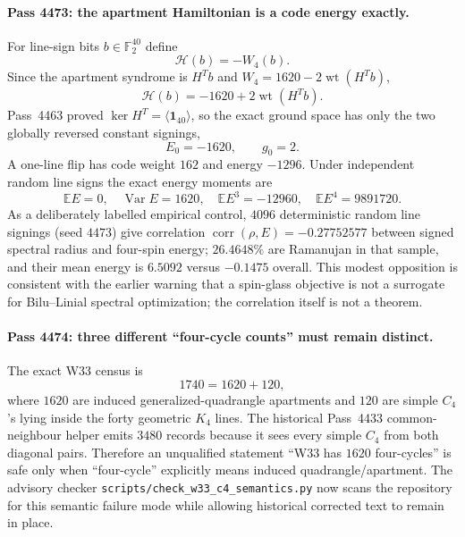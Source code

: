 \paragraph{Pass 4473: the apartment Hamiltonian is a code energy exactly.}
For line-sign bits $b\in\mathbb F_2^{40}$ define
\[
  \mathcal H(b)=-W_4(b).
\]
Since the apartment syndrome is $H^Tb$ and
$W_4=1620-2\operatorname{wt}(H^Tb)$,
\begin{equation}
  \boxed{\mathcal H(b)=-1620+2\operatorname{wt}(H^Tb).}
  \label{eq:pass4473-hamiltonian}
\end{equation}
Pass~4463 proved $\ker H^T=\langle\mathbf1_{40}\rangle$, so the exact ground
space has only the two globally reversed constant signings,
\begin{equation}
  \boxed{E_0=-1620,\qquad g_0=2.}
  \label{eq:pass4473-ground}
\end{equation}
A one-line flip has code weight $162$ and energy $-1296$.  Under independent
random line signs the exact energy moments are
\[
 \mathbb E E=0,
 \quad \operatorname{Var}E=1620,
 \quad \mathbb E E^3=-12960,
 \quad \mathbb E E^4=9891720.
\]
As a deliberately labelled empirical control, $4096$ deterministic random
line signings (seed $4473$) give correlation
$\operatorname{corr}(\rho,E)=-0.27752577$ between signed spectral radius and
four-spin energy; $26.4648\%$ are Ramanujan in that sample, and their mean
energy is $6.5092$ versus $-0.1475$ overall.  This modest opposition is
consistent with the earlier warning that a spin-glass objective is not a
surrogate for Bilu--Linial spectral optimization; the correlation itself is not
a theorem.

\paragraph{Pass 4474: three different ``four-cycle counts'' must remain distinct.}
The exact W33 census is
\begin{equation}
 \boxed{1740=1620+120,}
 \label{eq:pass4474-c4-census}
\end{equation}
where $1620$ are induced generalized-quadrangle apartments and $120$ are simple
$C_4$'s lying inside the forty geometric $K_4$ lines.  The historical
Pass~4433 common-neighbour helper emits $3480$ records because it sees every
simple $C_4$ from both diagonal pairs.  Therefore an unqualified statement
``W33 has $1620$ four-cycles'' is safe only when ``four-cycle'' explicitly means
induced quadrangle/apartment.  The advisory checker
\texttt{scripts/check\_w33\_c4\_semantics.py} now scans the repository for this
semantic failure mode while allowing historical corrected text to remain in
place.

